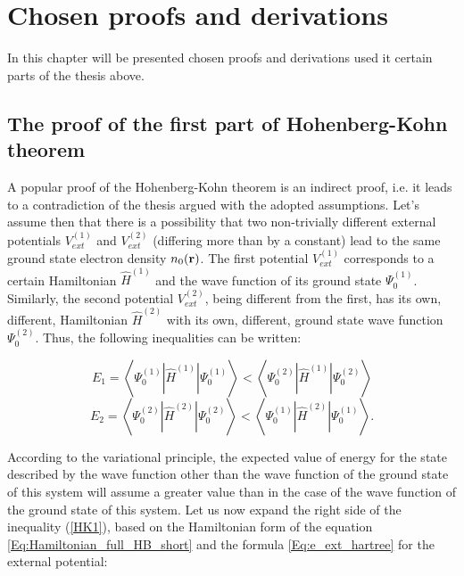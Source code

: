 \chapter{Chosen proofs and derivations}
\label{chap:derivations}

In this chapter will be presented chosen proofs and derivations used it certain parts of the thesis above.

\ornament

\section*{The proof of the first part of Hohenberg-Kohn theorem}
\label{chap:derivations_hk1}
A popular proof of the Hohenberg-Kohn theorem is an indirect proof, i.e. it leads to a contradiction of the thesis argued with the adopted assumptions.
Let's assume then that there is a possibility that two non-trivially different external potentials $V_{ext}^{(1)}$ and $V_{ext}^{(2)}$ (differing more than by a constant) lead to the same ground state electron density $n_0(\mathbf{r})$.
The first potential $V_{ext}^{(1)}$ corresponds to a certain Hamiltonian $\hat{H}^{(1)}$ and the wave function of its ground state $\Psi_0^{(1)}$.
Similarly, the second potential $V_{ext}^{(2)}$, being different from the first, has its own, different, Hamiltonian $\hat{H}^{(2)}$ with its own, different, ground state wave function $\Psi_0^{(2)}$.
Thus, the following inequalities can be written:

\begin{equation}
\label{HK1}
E_1=\left<\Psi_0^{(1)}\left|\hat{H}^{(1)}\right|\Psi_0^{(1)}\right><\left<\Psi_0^{(2)}\left|\hat{H}^{(1)}\right|\Psi_0^{(2)}\right>
\end{equation}
\begin{equation}
\label{HK2}
E_2=\left<\Psi_0^{(2)}\left|\hat{H}^{(2)}\right|\Psi_0^{(2)}\right><\left<\Psi_0^{(1)}\left|\hat{H}^{(2)}\right|\Psi_0^{(1)}\right>.
\end{equation}

According to the variational principle, the expected value of energy for the state described by the wave function other than the wave function of the ground state of this system will assume a greater value than in the case of the wave function of the ground state of this system.
Let us now expand the right side of the inequality (\ref{HK1}), based on the Hamiltonian form of the equation \ref{Eq:Hamiltonian_full_HB_short} and the formula \ref{Eq:e_ext_hartree} for the external potential:


